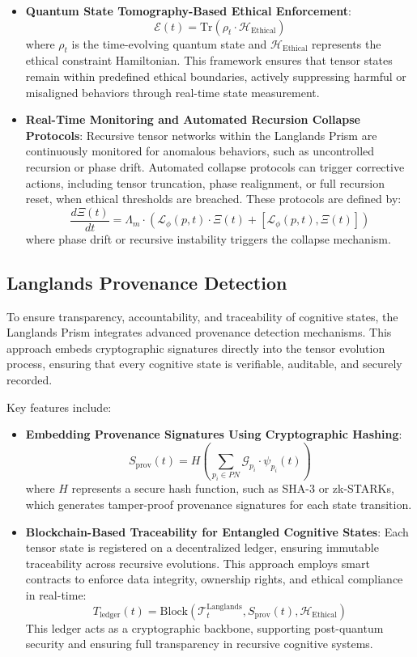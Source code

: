 \documentclass[11pt]{article}
\begin{document}
\begin{itemize}
    \item \textbf{Quantum State Tomography-Based Ethical Enforcement}:
    \[
    \mathcal{E}(t) = \text{Tr} \left( \rho_t \cdot \mathcal{H}_{\text{Ethical}} \right)
    \]
    where \(\rho_t\) is the time-evolving quantum state and \(\mathcal{H}_{\text{Ethical}}\) represents the ethical constraint Hamiltonian. This framework ensures that tensor states remain within predefined ethical boundaries, actively suppressing harmful or misaligned behaviors through real-time state measurement.

    \item \textbf{Real-Time Monitoring and Automated Recursion Collapse Protocols}:
    Recursive tensor networks within the Langlands Prism are continuously monitored for anomalous behaviors, such as uncontrolled recursion or phase drift. Automated collapse protocols can trigger corrective actions, including tensor truncation, phase realignment, or full recursion reset, when ethical thresholds are breached. These protocols are defined by:
    \[
    \frac{d\Xi(t)}{dt} = \Lambda_m \cdot \left( \mathcal{L}_{\phi}(p, t) \cdot \Xi(t) + [\mathcal{L}_{\phi}(p, t), \Xi(t)] \right)
    \]
    where phase drift or recursive instability triggers the collapse mechanism.
\end{itemize}

\subsection{Langlands Provenance Detection}

To ensure transparency, accountability, and traceability of cognitive states, the Langlands Prism integrates advanced provenance detection mechanisms. This approach embeds cryptographic signatures directly into the tensor evolution process, ensuring that every cognitive state is verifiable, auditable, and securely recorded.

Key features include:

\begin{itemize}
    \item \textbf{Embedding Provenance Signatures Using Cryptographic Hashing}:
    \[
    S_{\text{prov}}(t) = H\left(\sum_{p_i \in PN} \mathcal{G}_{p_i} \cdot \psi_{p_i}(t) \right)
    \]
    where \(H\) represents a secure hash function, such as SHA-3 or zk-STARKs, which generates tamper-proof provenance signatures for each state transition.

    \item \textbf{Blockchain-Based Traceability for Entangled Cognitive States}:
    Each tensor state is registered on a decentralized ledger, ensuring immutable traceability across recursive evolutions. This approach employs smart contracts to enforce data integrity, ownership rights, and ethical compliance in real-time:
    \[
    T_{\text{ledger}}(t) = \text{Block}\left(\mathcal{T}_t^{\text{Langlands}}, S_{\text{prov}}(t), \mathcal{H}_{\text{Ethical}} \right)
    \]
    This ledger acts as a cryptographic backbone, supporting post-quantum security and ensuring full transparency in recursive cognitive systems.
\end{itemize}
\end{document}
